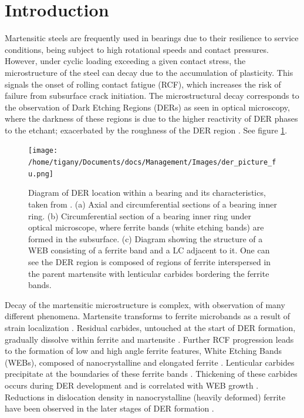 \documentclass[a4paper,11pt]{article}
\begin{document}
\clearpage

\section{Introduction}
\label{sec:org764f999}

Martensitic steels are frequently used in bearings due to their resilience to service conditions,
being subject to high rotational speeds and contact pressures. However, under cyclic loading
exceeding a given contact stress, the microstructure of the steel can decay due to the accumulation
of plasticity. This signals the onset of rolling contact fatigue (RCF), which increases the risk of
failure from subsurface crack initiation. The microstructural decay corresponds to the observation
of Dark Etching Regions (DERs) as seen in optical microscopy, where the darkness of these regions is due
to the higher reactivity of DER phases to the etchant; exacerbated by
the roughness of the DER region \cite{skf2019}. See figure \ref{fuderpicture}.

\begin{figure}[htbp]
\centering
\texttt{[image: /home/tigany/Documents/docs/Management/Images/der\_picture\_fu.png]}
\caption{Diagram of DER location within a bearing and its characteristics, taken from \cite{Fu2017}. (a) Axial and circumferential sections of a bearing inner ring. (b) Circumferential section of a bearing inner ring under optical microscope, where ferrite bands (white etching bands) are formed in the subsurface. (c) Diagram showing the structure of a WEB consisting of a ferrite band and a LC adjacent to it. One can see the DER region is composed of regions of ferrite interspersed in the parent martensite with lenticular carbides bordering the ferrite bands. \label{fuderpicture}}
\end{figure}


Decay of the martensitic microstructure is complex, with observation of many different
phenomena. Martensite transforms to ferrite microbands as a result of strain localization
\cite{Fu2017,il_micros_alter_rollin_contac_fatig,jonesil_metal_obser_ball_bearin_fatig_phenom,70_micros_microh_resid_stres_chang,Swahn1976,Voskamp1997,voskamp97_state_resid_stres_induc_by,polonsky95_white_etchin_band_format_rollin_bearin,vsmelova17_elect_micros_inves_micros_alter}. Residual
carbides, untouched at the start of DER formation, gradually dissolve within ferrite and
martensite \cite{70_micros_microh_resid_stres_chang,Swahn1976,Osterlund_1980}. Further RCF
progression leads to the formation of low and high angle ferrite features, White Etching Bands
(WEBs), composed of nanocrystalline \cite{Voskamp1997,Osterlund_1980,Mitamura_2007} and elongated
ferrite \cite{vsmelova17_elect_micros_inves_micros_alter}. Lenticular carbides precipitate at the
boundaries of these ferrite bands \cite{Swahn1976,Osterlund_1980}. Thickening of these carbides
occurs during DER development and is correlated with WEB growth
\cite{Fu2017,fu17_strain_induc_marten_decay_bearin,Warhadpande1_2013,Warhadpande2013}. Reductions in
dislocation density in nanocrystalline (heavily deformed) ferrite have been observed in the later
stages of DER formation \cite{skf2019,voskamp80_gradual_chang_resid_stres_micros}.
\end{document}
